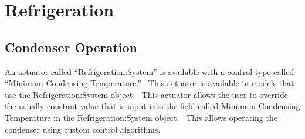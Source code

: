 \section{Refrigeration}\label{refrigeration}

\subsection{Condenser Operation}\label{condenser-operation}

An actuator called ``Refrigeration:System'' is available with a control type called ``Minimum Condensing Temperature.''~ This actuator is available in models that use the Refrigeration:System object.~ This actuator allows the user to override the usually constant value that is input into the field called Minimum Condensing Temperature in the Refrigeration:System object.~ This allows operating the condenser using custom control algorithms.
